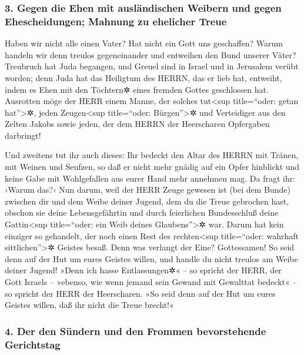 \hypertarget{gegen-die-ehen-mit-ausluxe4ndischen-weibern-und-gegen-ehescheidungen-mahnung-zu-ehelicher-treue}{%
\subsubsection{3. Gegen die Ehen mit ausländischen Weibern und gegen
Ehescheidungen; Mahnung zu ehelicher
Treue}\label{gegen-die-ehen-mit-ausluxe4ndischen-weibern-und-gegen-ehescheidungen-mahnung-zu-ehelicher-treue}}

 Haben wir nicht alle einen Vater? Hat nicht ein Gott uns
geschaffen? Warum handeln wir denn treulos gegeneinander und entweihen
den Bund unserer Väter?  Treubruch hat Juda begangen, und
Greuel sind in Israel und in Jerusalem verübt worden; denn Juda hat das
Heiligtum des HERRN, das er lieb hat, entweiht, indem es Ehen mit den
Töchtern✲ eines fremden Gottes geschlossen hat. 
Ausrotten möge der HERR einem Manne, der solches tut\textless sup
title=``oder: getan hat''\textgreater✲, jeden Zeugen\textless sup
title=``oder: Bürgen''\textgreater✲ und Verteidiger aus den Zelten
Jakobs sowie jeden, der dem HERRN der Heerscharen Opfergaben darbringt!

 Und zweitens tut ihr auch dieses: Ihr bedeckt den Altar
des HERRN mit Tränen, mit Weinen und Seufzen, so daß er nicht mehr
gnädig auf ein Opfer hinblickt und keine Gabe mit Wohlgefallen aus eurer
Hand mehr annehmen mag.  Da fragt ihr: ›Warum das?‹ Nun
darum, weil der HERR Zeuge gewesen ist (bei dem Bunde) zwischen dir und
dem Weibe deiner Jugend, dem du die Treue gebrochen hast, obschon sie
deine Lebensgefährtin und durch feierlichen Bundesschluß deine
Gattin\textless sup title=``oder: ein Weib deines
Glaubens''\textgreater✲ war.  Darum hat kein einziger so
gehandelt, der noch einen Rest des rechten\textless sup title=``oder:
wahrhaft sittlichen''\textgreater✲ Geistes besaß. Denn was verlangt der
Eine? Gottessamen! So seid denn auf der Hut um eures Geistes willen, und
handle du nicht treulos am Weibe deiner Jugend!  »Denn
ich hasse Entlassungen✲« -- so spricht der HERR, der Gott Israels --
»ebenso, wie wenn jemand sein Gewand mit Gewalttat bedeckt« -- so
spricht der HERR der Heerscharen. »So seid denn auf der Hut um eures
Geistes willen, daß ihr nicht die Treue brecht!«

\hypertarget{der-den-suxfcndern-und-den-frommen-bevorstehende-gerichtstag}{%
\subsubsection{4. Der den Sündern und den Frommen bevorstehende
Gerichtstag}\label{der-den-suxfcndern-und-den-frommen-bevorstehende-gerichtstag}}

